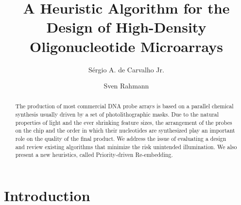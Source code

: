 \documentclass{llncs}
\begin{document}
\thispagestyle{empty}

\title{A Heuristic Algorithm for the Design of High-Density Oligonucleotide Microarrays}
\author{S\'ergio A. de Carvalho Jr. \and Sven Rahmann}

\maketitle

\begin{abstract}
The production of most commercial DNA probe arrays is based on a parallel chemical synthesis usually driven by a set of photolithographic masks. Due to the natural properties of light and the ever shrinking feature sizes, the arrangement of the probes on the chip and the order in which their nucleotides are synthesized play an important role on the quality of the final product. We address the issue of evaluating a design and review existing algorithms that minimize the risk unintended illumination. We also present a new heuristics, called Priority-driven Re-embedding.
\end{abstract}


\section{Introduction}
\end{document}
